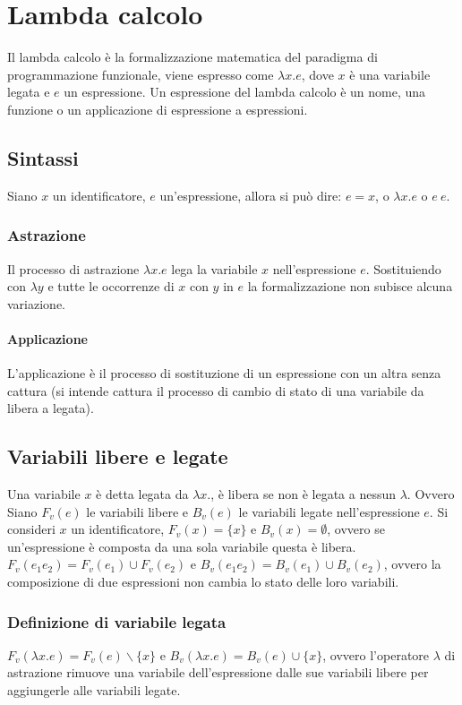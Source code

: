 \chapter{Lambda calcolo}
Il lambda calcolo \`e la formalizzazione matematica del paradigma di programmazione funzionale, viene espresso come $\lambda x.e$, dove $x$ \`e una variabile legata e $e$ un
espressione. Un espressione del lambda calcolo \`e un nome, una funzione o un applicazione di espressione a espressioni. 
\section{Sintassi}
Siano $x$ un identificatore, $e$ un'espressione, allora si pu\`o dire: $e=x$, o $\lambda x.e$  o $e\ e$. 
\subsection{Astrazione}
Il processo di astrazione $\lambda x.e$ lega la variabile $x$ nell'espressione $e$. Sostituiendo con $\lambda y$ e tutte le occorrenze di $x$ con $y$ in $e$ la formalizzazione
non subisce alcuna variazione. 
\subsubsection{Applicazione}
L'applicazione \`e il processo di sostituzione di un espressione con un altra senza cattura (si intende cattura il processo di cambio di stato di una variabile da libera a 
legata). 
\section{Variabili libere e legate}
Una variabile $x$ \`e detta legata da $\lambda x.$, \`e libera se non \`e legata a nessun $\lambda$. Ovvero Siano $F_v(e)$ le variabili libere e $B_v(e)$ le variabili legate 
nell'espressione $e$. Si consideri $x$ un identificatore, $F_v(x)=\{x\}$ e $B_v(x)=\emptyset$, ovvero se un'espressione \`e composta da una sola variabile questa \`e libera.
$F_v(e_1e_2)=F_v(e_1)\cup F_v(e_2)$ e $B_v(e_1e_2)=B_v(e_1)\cup B_v(e_2)$, ovvero la composizione di due espressioni non cambia lo stato delle loro variabili. 
\subsection{Definizione di variabile legata}
$F_v(\lambda x.e)=F_v(e)\backslash\{x\}$ e $B_v(\lambda x.e)=B_v(e)\cup\{x\}$, ovvero l'operatore $\lambda$ di astrazione rimuove una variabile dell'espressione dalle sue 
variabili libere per aggiungerle alle variabili legate. 
